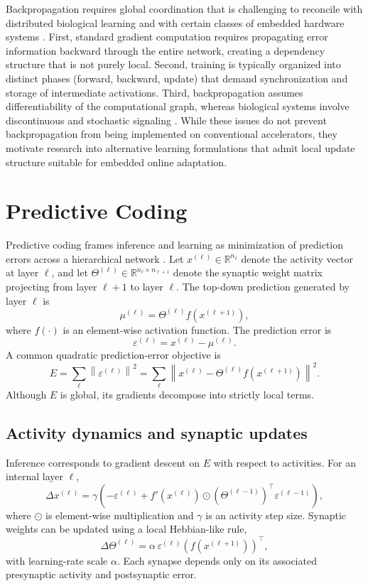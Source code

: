 \documentclass{article}
\begin{document}
Backpropagation requires global coordination that is challenging to reconcile with distributed biological learning and with certain classes of embedded hardware systems \cite{lillicrap2020backpropagation}. First, standard gradient computation requires propagating error information backward through the entire network, creating a dependency structure that is not purely local. Second, training is typically organized into distinct phases (forward, backward, update) that demand synchronization and storage of intermediate activations. Third, backpropagation assumes differentiability of the computational graph, whereas biological systems involve discontinuous and stochastic signaling \cite{rumelhart1986learning}. While these issues do not prevent backpropagation from being implemented on conventional accelerators, they motivate research into alternative learning formulations that admit local update structure suitable for embedded online adaptation.

\section{Predictive Coding}
\label{sec:pc}

Predictive coding frames inference and learning as minimization of prediction errors across a hierarchical network \cite{rao1999predictive, friston2005theory}. Let \( x^{(\ell)} \in \mathbb{R}^{n_\ell} \) denote the activity vector at layer \( \ell \), and let
\( \Theta^{(\ell)} \in \mathbb{R}^{n_\ell \times n_{\ell+1}} \) denote the synaptic weight matrix projecting from layer \( \ell+1 \) to layer \( \ell \). The top-down prediction generated by layer \( \ell \) is
\[
\mu^{(\ell)} = \Theta^{(\ell)} f\!\left(x^{(\ell+1)}\right),
\]
where \( f(\cdot) \) is an element-wise activation function. The prediction error is
\[
\varepsilon^{(\ell)} = x^{(\ell)} - \mu^{(\ell)}.
\]
A common quadratic prediction-error objective is
\[
E = \sum_{\ell} \left\| \varepsilon^{(\ell)} \right\|^2
= \sum_{\ell} \left\| x^{(\ell)} - \Theta^{(\ell)} f\!\left(x^{(\ell+1)}\right) \right\|^2.
\]
Although \(E\) is global, its gradients decompose into strictly local terms.

\subsection{Activity dynamics and synaptic updates}
\label{sec:pc-dynamics}

Inference corresponds to gradient descent on \(E\) with respect to activities. For an internal layer \( \ell \),
\[
\Delta x^{(\ell)}
= \gamma \left(
    -\varepsilon^{(\ell)}
    + f'\!\left(x^{(\ell)}\right) \odot
      \left(\Theta^{(\ell-1)}\right)^{\!\top} \varepsilon^{(\ell-1)}
  \right),
\]
where \( \odot \) is element-wise multiplication and \( \gamma \) is an activity step size. Synaptic weights can be updated using a local Hebbian-like rule,
\[
\Delta \Theta^{(\ell)}
= \alpha \, \varepsilon^{(\ell)} \left( f\!\left(x^{(\ell+1)}\right) \right)^{\!\top},
\]
with learning-rate scale \( \alpha \). Each synapse depends only on its associated presynaptic activity and postsynaptic error.
\end{document}
